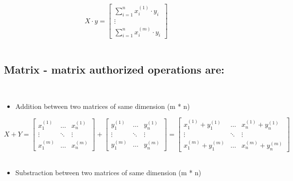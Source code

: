 \documentclass[]{article}
\providecommand{\tightlist}{%
  \setlength{\itemsep}{0pt}\setlength{\parskip}{0pt}}
\begin{document}
\large

\[
X \cdot y = \begin{bmatrix} \sum_{i = 1}^{n} x_{i}^{(1)} \cdot y_i \\ \vdots \\ \sum_{i = 1}^{n} x_{i}^{(m)} \cdot y_i \end{bmatrix}
\] \normalsize ​

\hypertarget{matrix---matrix-authorized-operations-are}{%
\subsection{Matrix - matrix authorized operations
are:}\label{matrix---matrix-authorized-operations-are}}

​

\begin{itemize}
\tightlist
\item
  Addition between two matrices of same dimension (m * n)
\end{itemize}

\large

\[
X + Y = 
\begin{bmatrix} 
x_{1}^{(1)} & \dots & x_{n}^{(1)}  \\ 
\vdots & \ddots & \vdots \\ 
x_{1}^{(m)} & \dots & x_{n}^{(m)} 
\end{bmatrix} +  
\begin{bmatrix} 
y_{1}^{(1)} & \dots & y_{n}^{(1)}  \\ 
\vdots & \ddots & \vdots \\ 
y_{1}^{(m)} & \dots & y_{n}^{(m)} 
\end{bmatrix} = 
\begin{bmatrix} 
x_{1}^{(1)} + y_{1}^{(1)}  & \dots & x_{n}^{(1)} + y_{n}^{(1)}  \\ 
\vdots & \ddots & \vdots \\ 
x_{1}^{(m)} + y_{1}^{(m)} & \dots & x_{n}^{(m)} + y_{n}^{(m)}
\end{bmatrix}
\] \normalsize ​

\begin{itemize}
\tightlist
\item
  Substraction between two matrices of same dimension (m * n)
\end{itemize}

\large
\end{document}
